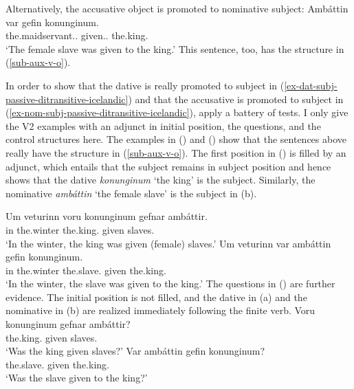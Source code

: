 Alternatively, the accusative object is promoted to nominative subject:
\ea
\label{ex-nom-subj-passive-ditransitive-icelandic}
\gll Ambáttin var gefin konunginum.\\
     the.maidservant.\NOM.\SG{}  \AUX{} given.\F.\SG{} the.king.\DAT\\\icelandic
\glt `The female slave was given to the king.'
\z
This sentence, too, has the structure in (\ref{sub-aux-v-o}).

In order to show that the dative is really promoted to subject in
(\ref{ex-dat-subj-passive-ditransitive-icelandic}) and that the accusative is promoted to subject in
(\ref{ex-nom-subj-passive-ditransitive-icelandic}), \citet*[]{ZMT85a} apply a battery of
tests. I only give the V2 examples with an adjunct in initial position, the questions, and the
control structures here. The examples in () and () show that the sentences above
really have the structure in (\ref{sub-aux-v-o}). The first position in () is filled by an
adjunct, which entails that the subject remains in subject position and hence shows that the dative
\emph{konunginum} `the king' is the subject. Similarly, the nominative \emph{ambáttin} `the female
slave' is the subject in (b).

\eal
\ex
\gll Um veturinn voru konunginum gefnar ambáttir.\\
     in the.winter \AUX{} the.king.\DAT{} given slaves.\NOM\\\icelandic
\glt `In the winter, the king was given (female) slaves.'
\ex
\gll Um veturinn var ambáttin gefin konunginum.\\
     in the.winter \AUX{} the.slave.\NOM{} given the.king.\NOM\\
\glt `In the winter, the slave was given to the king.'
\zl
The questions in () are further evidence. The initial position is not filled, and the dative
in (a) and the nominative in (b) are realized immediately following the finite verb.
\eal
\ex\label{ex-were-the-king-given-the-slaves}
\gll Voru konunginum gefnar ambáttir?\\
     \AUX{} the.king.\DAT{} given slaves.\NOM{}\\\icelandic
\glt `Was the king given slaves?'
\ex\label{ex-were-the-slaves-given-the-king}
\gll Var ambáttin gefin konunginum?\\
     \AUX{} the.slave.\NOM{} given the.king.\DAT\\
\glt `Was the slave given to the king?'
\zl

